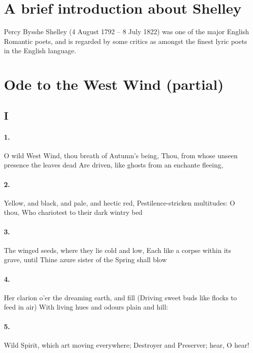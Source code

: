 \documentclass{doc}
\begin{document}
	\section{A brief introduction about Shelley}
		Percy Bysshe Shelley (4 August 1792 -- 8 July 1822) was one of the major English Romantic poets, and is regarded by some critics as amongst the finest lyric poets in the English language. 
	\section{Ode to the West Wind (partial)}
		\subsection{I}
			\paragraph{1.}
				O wild West Wind, thou breath of Autumn's being, \newline 
				Thou, from whose unseen presence the leaves dead \newline 
				Are driven, like ghosts from an enchante fleeing,
			\paragraph{2.}
				Yellow, and black, and pale, and hectic red,\newline 
				Pestilence-stricken multitudes: O thou, \newline	
				Who chariotest to their dark wintry bed
			\paragraph{3.}
				The winged seeds, where they lie cold and low,\newline	
				Each like a corpse within its grave, until \newline
				Thine azure sister of the Spring shall blow
			\paragraph{4.}
				Her clarion o'er the dreaming earth, and fill \newline (Driving sweet buds like flocks to feed in air) \newline With living hues and odours plain and hill:
			\paragraph{5.}
				Wild Spirit, which art moving everywhere; \newline Destroyer and Preserver; hear, O hear!
\end{document}
